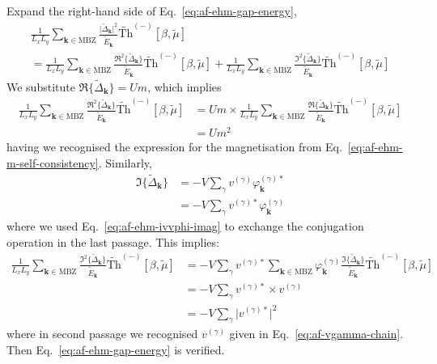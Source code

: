 \begin{tabproof}
	
	Expand the right-hand side of Eq.~\eqref{eq:af-ehm-gap-energy},
	\begin{multline*}
		\frac{1}{L_x L_y} \sum_{\mathbf{k} \in \mathrm{MBZ}} \frac{\big|
			\tilde{\Delta}_\mathbf{k}
			\big|^2}{\tilde{E}_\mathbf{k}} \tilde{\mathrm{Th}}^{(-)}[\beta,\tilde{\mu}] \\
		= \frac{1}{L_x L_y} \sum_{\mathbf{k} \in \mathrm{MBZ}} \frac{\Re^2 \lbrace\tilde{\Delta}_\mathbf{k}\rbrace}{\tilde{E}_\mathbf{k}} \tilde{\mathrm{Th}}^{(-)}[\beta,\tilde{\mu}] 
		+ \frac{1}{L_x L_y} \sum_{\mathbf{k} \in \mathrm{MBZ}} \frac{\Im^2 \lbrace\tilde{\Delta}_\mathbf{k}\rbrace}{\tilde{E}_\mathbf{k}} \tilde{\mathrm{Th}}^{(-)}[\beta,\tilde{\mu}]
	\end{multline*}
	We substitute $\Re \lbrace\tilde{\Delta}_\mathbf{k}\rbrace = Um$, which implies
	\[
	\begin{aligned}
		\frac{1}{L_x L_y} \sum_{\mathbf{k} \in \mathrm{MBZ}} \frac{\Re^2 \lbrace\tilde{\Delta}_\mathbf{k}\rbrace}{\tilde{E}_\mathbf{k}} \tilde{\mathrm{Th}}^{(-)}[\beta,\tilde{\mu}] &= Um \times
		\frac{1}{L_x L_y} \sum_{\mathbf{k} \in \mathrm{MBZ}} \frac{\Re \lbrace\tilde{\Delta}_\mathbf{k}\rbrace}{\tilde{E}_\mathbf{k}} \tilde{\mathrm{Th}}^{(-)}[\beta,\tilde{\mu}] \\
		&= Um^2
	\end{aligned}
	\]
	having we recognised the expression for the magnetisation from Eq.~\eqref{eq:af-ehm-m-self-consistency}. Similarly,
	\[
	\begin{aligned}
		\Im \lbrace\tilde{\Delta}_\mathbf{k}\rbrace &= - V \sum_\gamma v^{(\gamma)} \varphi_\mathbf{k}^{(\gamma)*} \\
		&= - V \sum_\gamma v^{(\gamma)*} \varphi_\mathbf{k}^{(\gamma)}
	\end{aligned}
	\]
	where we used Eq.~\eqref{eq:af-ehm-ivvphi-imag} to exchange the conjugation operation in the last passage. This implies:
	\[
	\begin{aligned}
		\frac{1}{L_x L_y} \sum_{\mathbf{k} \in \mathrm{MBZ}} \frac{\Im^2 \lbrace\tilde{\Delta}_\mathbf{k}\rbrace}{\tilde{E}_\mathbf{k}} \tilde{\mathrm{Th}}^{(-)}[\beta,\tilde{\mu}] &= - V \sum_\gamma v^{(\gamma)*} \sum_{\mathbf{k} \in \mathrm{MBZ}} \varphi_\mathbf{k}^{(\gamma)} \frac{\Im \lbrace\tilde{\Delta}_\mathbf{k}\rbrace}{\tilde{E}_\mathbf{k}} \tilde{\mathrm{Th}}^{(-)}[\beta,\tilde{\mu}] \\
		&= - V \sum_\gamma v^{(\gamma)*} \times v^{(\gamma)} \\
		&= - V \sum_\gamma \big| v^{(\gamma)*} \big|^2
	\end{aligned}
	\]
	where in second passage we recognised $v^{(\gamma)}$ given in Eq.~\eqref{eq:af-vgamma-chain}. Then Eq.~\eqref{eq:af-ehm-gap-energy} is verified. 
	
\end{tabproof}

